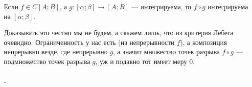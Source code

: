 \documentclass{article}
\begin{document}
\begin{itemize}
\begin{Example}
        \end{Example}
        \thm Если $f\in C[A;B]$, а $g\colon[\alpha;\beta]\to[A;B]$ --- интегрируема, то $f\circ g$ интегрируема на $[\alpha;\beta]$.
        \begin{Proof}
            Доказывать это честно мы не будем, а скажем лишь, что из критерия Лебега очевидно. Ограниченность у нас есть (из непрерывности $f$), а композиция непрерывно везде, где непрерывно $g$, а значит множество точек разрыва $f\circ g$ --- подмножество точек разрыва $g$, уж и подавно тот имеет меру 0.
        \end{Proof}
    \end{itemize}
    \paragraph{.}
\end{document}
